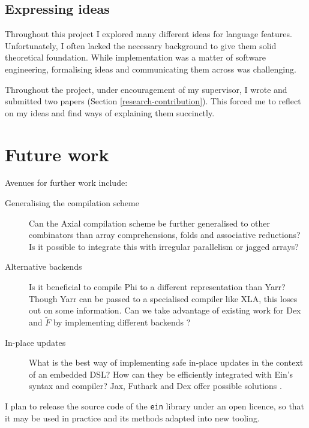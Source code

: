 \subsection{Expressing ideas}

Throughout this project I explored many different ideas for language features. 
Unfortunately, I often lacked the necessary background to give them solid theoretical foundation. 
While implementation was a matter of software engineering, formalising ideas and communicating them across was challenging. 

Throughout the project, under encouragement of my supervisor, I wrote and submitted two papers (Section \ref{research-contribution}). 
This forced me to reflect on my ideas and find ways of explaining them succinctly.

\section{Future work}

Avenues for further work include:
\begin{description}
    \item[Generalising the compilation scheme] Can the Axial compilation scheme be further generalised to other combinators than array comprehensions, folds and associative reductions? Is it possible to integrate this with irregular parallelism or jagged arrays?
    \item[Alternative backends] Is it beneficial to compile Phi to a different representation than Yarr? Though Yarr can be passed to a specialised compiler like XLA, this loses out on some information. Can we take advantage of existing work for Dex and $\tilde F$ by implementing different backends \cite{shaikhha2019efficient, paszke2021getting}?
    \item[In-place updates] What is the best way of implementing safe in-place updates in the context of an embedded DSL? How can they be efficiently integrated with Ein's syntax and compiler? Jax, Futhark and Dex offer possible solutions \cite{frostig2018compiling, henriksen2017futhark, paszke2021getting}.
\end{description}
I plan to release the source code of the \texttt{ein} library under an open licence, so that it may be used in practice and its methods adapted into new tooling.